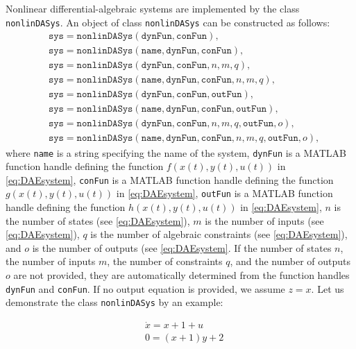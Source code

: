 Nonlinear differential-algebraic systems are implemented by the class \texttt{nonlinDASys}. An object of class \texttt{nonlinDASys} can be constructed as follows:
\begin{equation*}
	\begin{split}
		& \texttt{sys} = \texttt{nonlinDASys}(\texttt{dynFun},\texttt{conFun}), \\
     	& \texttt{sys} = \texttt{nonlinDASys}(\texttt{name},\texttt{dynFun},\texttt{conFun}), \\
    	& \texttt{sys} = \texttt{nonlinDASys}(\texttt{dynFun},\texttt{conFun},n,m,q), \\
     	& \texttt{sys} = \texttt{nonlinDASys}(\texttt{name},\texttt{dynFun},\texttt{conFun},n,m,q), \\
     	& \texttt{sys} = \texttt{nonlinDASys}(\texttt{dynFun},\texttt{conFun},\texttt{outFun}), \\
     	& \texttt{sys} = \texttt{nonlinDASys}(\texttt{name},\texttt{dynFun},\texttt{conFun},\texttt{outFun}), \\
     	& \texttt{sys} = \texttt{nonlinDASys}(\texttt{dynFun},\texttt{conFun},n,m,q,\texttt{outFun},o), \\
     	& \texttt{sys} = \texttt{nonlinDASys}(\texttt{name},\texttt{dynFun},\texttt{conFun},n,m,q,\texttt{outFun},o),
	\end{split}
\end{equation*} 
where \texttt{name} is a string specifying the name of the system, \texttt{dynFun} is a MATLAB function handle defining the function $f(x(t),y(t),u(t))$ in \eqref{eq:DAEsystem}, \texttt{conFun} is a MATLAB function handle defining the function $g(x(t),y(t),u(t))$ in \eqref{eq:DAEsystem}, \texttt{outFun} is a MATLAB function handle defining the function $h(x(t),y(t),u(t))$ in \eqref{eq:DAEsystem}, $n$ is the number of states (see \eqref{eq:DAEsystem}), $m$ is the number of inputs (see \eqref{eq:DAEsystem}), $q$ is the number of algebraic constraints (see \eqref{eq:DAEsystem}), and $o$ is the number of outputs (see \eqref{eq:DAEsystem}. If the number of states $n$, the number of inputs $m$, the number of constraints $q$, and the number of outputs $o$ are not provided, they are automatically determined from the function handles \texttt{dynFun} and \texttt{conFun}. If no output equation is provided, we assume $z = x$. Let us demonstrate the class \texttt{nonlinDASys} by an example:

\begin{center}
\begin{minipage}[t]{0.48\textwidth}
	\vspace{10pt}
	\begin{equation*}
	\begin{split}
		& \dot x = x + 1 + u \\
		& 0 = (x + 1)y + 2
	\end{split}
\end{equation*}
\end{minipage}
\begin{minipage}[t]{0.48\textwidth}
	\footnotesize
	
\end{minipage}
\end{center}


